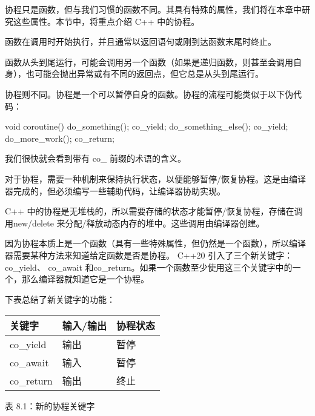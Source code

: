 
协程只是函数，但与我们习惯的函数不同。其具有特殊的属性，我们将在本章中研究这些属性。本节中，将重点介绍 C++ 中的协程。

函数在调用时开始执行，并且通常以返回语句或刚到达函数末尾时终止。

函数从头到尾运行，可能会调用另一个函数（如果是递归函数，则甚至会调用自身），也可能会抛出异常或有不同的返回点，但它总是从头到尾运行。

协程则不同。协程是一个可以暂停自身的函数。协程的流程可能类似于以下伪代码：

\begin{cpp}
void coroutine() {
    do_something();
    co_yield;
    do_something_else();
    co_yield;
    do_more_work();
    co_return;
}
\end{cpp}

我们很快就会看到带有 co\_ 前缀的术语的含义。

对于协程，需要一种机制来保持执行状态，以便能够暂停/恢复协程。这是由编译器完成的，但必须编写一些辅助代码，让编译器协助实现。

C++ 中的协程是无堆栈的，所以需要存储的状态才能暂停/恢复协程，存储在调用new/delete 来分配/释放动态内存的堆中。这些调用由编译器创建。


因为协程本质上是一个函数（具有一些特殊属性，但仍然是一个函数），所以编译器需要某种方法来知道给定函数是否是协程。 C++20 引入了三个新关键字： co\_yield、 co\_await 和co\_return。如果一个函数至少使用这三个关键字中的一个，那么编译器就知道它是一个协程。

下表总结了新关键字的功能：

\begin{longtable}{|l|l|l|}
\hline
\textbf{关键字} & \textbf{输入/输出} & \textbf{协程状态} \\ \hline
\endfirsthead
%
\endhead
%
co\_yield    & 输出             & 暂停            \\ \hline
co\_await    & 输入             & 暂停            \\ \hline
co\_return   & 输出             & 终止            \\ \hline
\end{longtable}

\begin{center}
表 8.1：新的协程关键字
\end{center}


